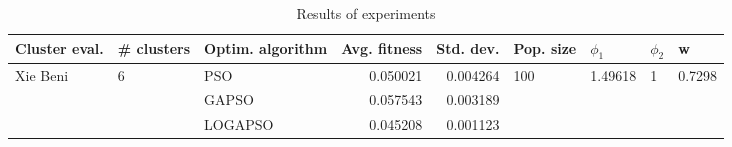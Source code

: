 \begin{table}
\centering
\caption{Results of experiments}
\begin{tabular}{lllrrllll}
\toprule
            Cluster eval. &        \# clusters & Optim. algorithm &  Avg. fitness &  Std. dev. &            Pop. size &               $\phi_{1}$ &         $\phi_{2}$ &                       w \\
\midrule
\multirow{3}{*}{Xie Beni} & \multirow{3}{*}{6} &              PSO &      0.050021 &   0.004264 & \multirow{3}{*}{100} & \multirow{3}{*}{1.49618} & \multirow{3}{*}{1} & \multirow{3}{*}{0.7298} \\
                          &                    &            GAPSO &      0.057543 &   0.003189 &                      &                          &                    &                         \\
                          &                    &          LOGAPSO &      0.045208 &   0.001123 &                      &                          &                    &                         \\
\bottomrule
\end{tabular}
\end{table}
